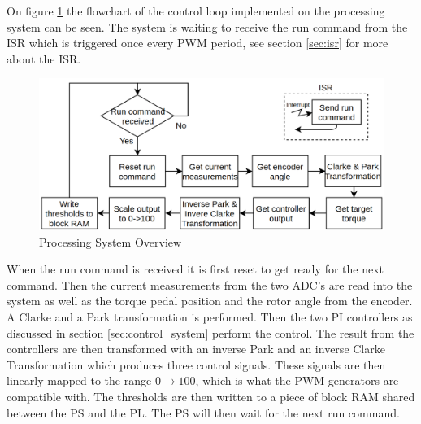 On figure \ref{fig:software_flow} the flowchart of the control loop implemented on the processing system can be seen. The system is waiting to receive the run command from the ISR which is triggered once every PWM period, see section \ref{sec:isr} for more about the ISR. 


\begin{figure}[H]
	\centering
	\includegraphics[width=0.9\linewidth]{pictures/software/software_flow.png}
	\caption{Processing System Overview}
	\label{fig:software_flow}
\end{figure}

When the run command is received it is first reset to get ready for the next command. Then the current measurements from the two ADC's are read into the system as well as the torque pedal position and the rotor angle from the encoder. A Clarke and a Park transformation is performed. Then the two PI controllers as discussed in section \ref{sec:control_system} perform the control. The result from the controllers are then transformed with an inverse Park and an inverse Clarke Transformation which produces three control signals. These signals are then linearly mapped to the range $0 \rightarrow 100$, which is what the PWM generators are compatible with. 
The thresholds are then written to a piece of block RAM shared between the PS and the PL. The PS will then wait for the next run command.



